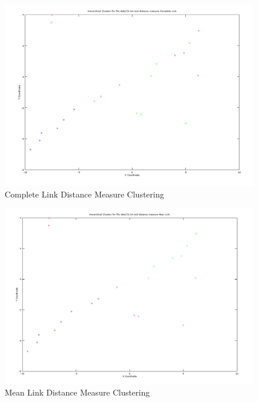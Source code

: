 \documentclass[11pt]{article}
\begin{document}
\begin{figure}[!htb]
\centering
\includegraphics[width=5in]{figures/1ACompleteLink.png}
\caption{Complete Link Distance Measure Clustering}
\label{CLC}
\end{figure}

\begin{figure}[!htb]
\centering
\includegraphics[width=5in]{figures/1AMeanLink.png}
\caption{Mean Link Distance Measure Clustering}
\label{MLC}
\end{figure}
\end{document}

